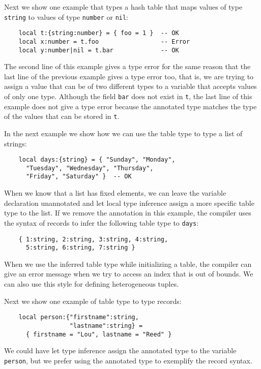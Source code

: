 \documentclass[preprint]{sig-alternate}
\begin{document}
Next we show one example that types a hash table that maps values
of type \verb'string' to values of type \verb'number' or \verb'nil':
\begin{verbatim}
    local t:{string:number} = { foo = 1 }  -- OK
    local x:number = t.foo                 -- Error
    local y:number|nil = t.bar             -- OK
\end{verbatim}

The second line of this example gives a type error for the same
reason that the last line of the previous example gives a type error
too, that is, we are trying to assign a value that can be of two
different types to a variable that accepts values of only one type.
Although the field \verb'bar' does not exist in \verb't', the last
line of this example does not give a type error because the
annotated type matches the type of the values that can be stored in
\verb't'.

In the next example we show how we can use the table type to type a
list of strings:
\begin{verbatim}
    local days:{string} = { "Sunday", "Monday",
      "Tuesday", "Wednesday", "Thursday",
      "Friday", "Saturday" }  -- OK
\end{verbatim}

When we know that a list has fixed elements, we can leave the
variable declaration unannotated and let local type inference assign
a more specific table type to the list.
If we remove the annotation in this example, the compiler uses the
syntax of records to infer the following table type to \verb'days':
\begin{verbatim}
    { 1:string, 2:string, 3:string, 4:string,
      5:string, 6:string, 7:string }
\end{verbatim}

When we use the inferred table type while initializing a table, the
compiler can give an error message when we try to access an index that
is out of bounds.
We can also use this style for defining heterogeneous tuples.

Next we show one example of table type to type records:
\begin{verbatim}
    local person:{"firstname":string,
                  "lastname":string} =
      { firstname = "Lou", lastname = "Reed" } 
\end{verbatim}

We could have let type inference assign the annotated type to the
variable \verb'person', but we prefer using the annotated type to
exemplify the record syntax.
\end{document}
